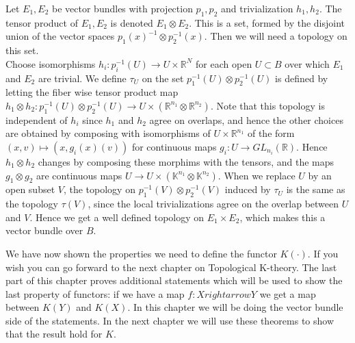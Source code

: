 \documentclass[../Thesis.tex]{subfiles}
\begin{document}
\begin{mydef}
Let $E_1, E_2$ be vector bundles with projection $p_1, p_2$ and trivialization $h_1, h_2$. The tensor product of $E_1, E_2$ is denoted $E_1 \otimes E_2$. This is a set, formed by the disjoint union of the vector spaces $p_1(x)^{-1} \otimes p_2^{-1}(x)$. Then we will need a topology on this set. 
\\Choose isomorphisms $h_i : p_i^{-1}(U) \rightarrow U \times \mathbb{R}^N$ for each open $U \subset B$ over which $E_1$ and $E_2$ are trivial. We define $\tau_U$ on the set $p_1^{-1}(U) \otimes p_2^{-1}(U)$ is defined by letting the fiber wise tensor product map $h_1 \otimes h_2 :p_1^{-1}(U) \otimes p_2^{-1}(U) \rightarrow U \times ( \mathbb{R}^{n_1} \otimes \mathbb{R}^{n_2})$. Note that this topology is independent of $h_i$ since $h_1$ and $h_2$ agree on overlaps, and hence the other choices are obtained by composing with isomorphisms of $U \times \mathbb{R}^{n_1}$ of the form $(x,v) \mapsto (x, g_i(x)(v))$ for continuous maps $g_i : U \rightarrow GL_{n_i}(\mathbb{R})$. Hence $h_1 \otimes h_2$ changes by composing these morphims with the tensors, and the maps $g_1 \otimes g_2$ are continuous maps $U \rightarrow U \times ( \mathbb{K}^{n_1} \otimes \mathbb{K}^{n_2})$.  When we replace $U$ by an open subset $V$, the topology on $p_1^{-1}(V) \otimes p_2^{-1}(V)$ induced by $\tau_U$ is the same as the topology $\tau(V)$, since the local trivializations agree on the overlap between $U$ and $V$. Hence we get a well defined topology on $E_1 \times E_2$, which makes this a vector bundle over $B$.
\end{mydef}
We have now shown the properties we need to define the functor $K(\cdot)$. If you wish you can go forward to the next chapter on Topological K-theory. The last part of this chapter proves additional statements which will be used to show the last property of functors: if we have a map $f : X rightarrow Y$ we get a map between $K(Y)$ and $K(X)$. In this chapter we will be doing the vector bundle side of the statements. In the next chapter we will use these theorems to show that the result hold for $K$.
\end{document}
